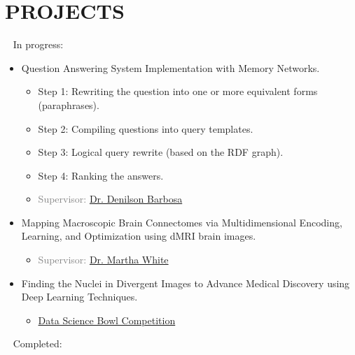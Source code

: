 \section{PROJECTS}
\vspace{0.3em}
\textcolor{red}{\faSpinner} ~ In progress:
	\begin{itemize}
		\item Question Answering System Implementation with Memory Networks.
		\begin{itemize}
			\item Step 1: Rewriting the question into one or more 
			equivalent forms (paraphrases).
			\item Step 2: Compiling questions into query templates.
			\item Step 3: Logical query rewrite (based on the
			RDF graph).
			\item Step 4: Ranking the answers.
			\item \textcolor{gray}{Supervisor: \href{https://sites.ualberta.ca/~denilson/}{Dr. Denilson Barbosa}}
		\end{itemize}
		
		\item Mapping Macroscopic Brain Connectomes via
		Multidimensional Encoding, Learning, and Optimization using dMRI brain images.
		\begin{itemize}
			\item \textcolor{gray}{Supervisor: \href{http://webdocs.cs.ualberta.ca/~whitem/}{Dr. Martha White}}
		\end{itemize}
		
		\item Finding the Nuclei in Divergent Images to Advance
		Medical Discovery using Deep Learning Techniques.
		\begin{itemize}
			\item \textcolor{gray}{\href{https://www.kaggle.com/c/data-science-bowl-2018}{Data Science Bowl Competition}}
		\end{itemize}
		
	\end{itemize}
	\vspace{0.3em}
	\textcolor{darkgreen}{\faCheckSquareO} ~ Completed:
